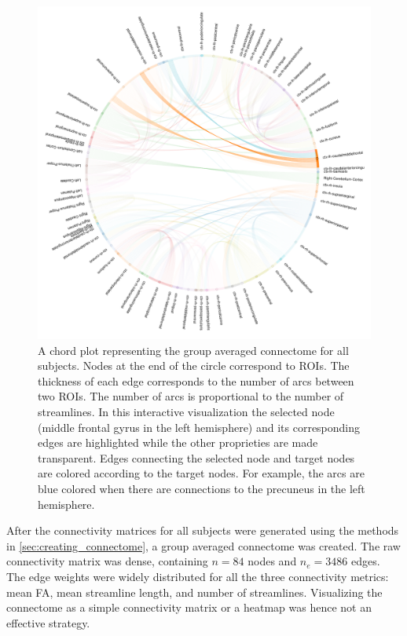 \documentclass[msthesis.tex]{subfiles}
\begin{document}
\begin{figure}
    \centering
    \includegraphics[width=\textwidth]{images/selected_view_all.png}
    \caption{A chord plot representing the group averaged connectome for all subjects. Nodes at the end of the circle correspond to \gls{ROI}s. The thickness of each edge corresponds to the number of arcs between two \gls{ROI}s. The number of arcs is proportional to the number of streamlines. In this interactive visualization the selected node (middle frontal gyrus in the left hemisphere) and its corresponding edges are highlighted while the other proprieties are made transparent. Edges connecting the selected node and target nodes are colored according to the target nodes. For example, the arcs are blue colored when there are connections to the precuneus in the left hemisphere.}
    \label{fig:connectome_num_streamlines}
\end{figure}

After the connectivity matrices for all subjects were generated using the methods in \autoref{sec:creating_connectome}, a group averaged connectome was created. The raw connectivity matrix was dense, containing $n = 84$ nodes and $n_e = 3486$ edges. The edge weights were widely distributed for all the three connectivity metrics: mean FA, mean streamline length, and number of streamlines. Visualizing the connectome as a simple connectivity matrix or a heatmap was hence not an effective strategy.
\end{document}
